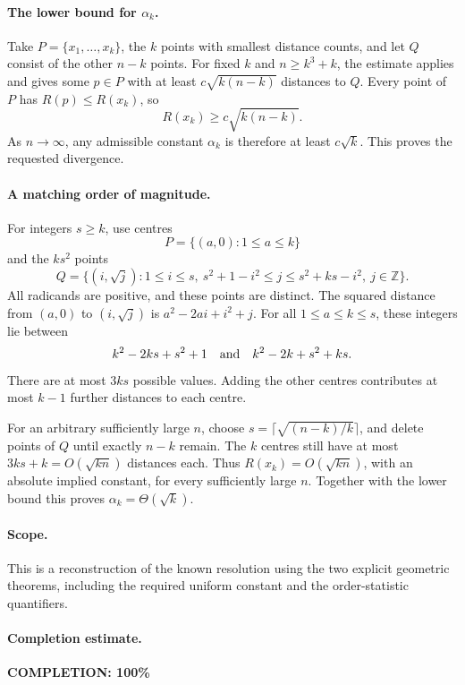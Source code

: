 \paragraph{The lower bound for \(\alpha_k\).}
Take \(P=\{x_1,\ldots,x_k\}\), the \(k\) points with smallest
distance counts, and let \(Q\) consist of the other \(n-k\) points.
For fixed \(k\) and \(n\geq k^3+k\), the estimate applies and gives
some \(p\in P\) with at least \(c\sqrt{k(n-k)}\) distances to \(Q\).
Every point of \(P\) has \(R(p)\leq R(x_k)\), so
\[
 R(x_k)\geq c\sqrt{k(n-k)}.
\]
As \(n\to\infty\), any admissible constant \(\alpha_k\) is therefore
at least \(c\sqrt k\). This proves the requested divergence.

\paragraph{A matching order of magnitude.}
For integers \(s\geq k\), use centres
\[
 P=\{(a,0):1\leq a\leq k\}
\]
and the \(ks^2\) points
\[
 Q=\{(i,\sqrt j):1\leq i\leq s,\
          s^2+1-i^2\leq j\leq s^2+ks-i^2,\ j\in\mathbb Z\}.
\]
All radicands are positive, and these points are distinct.
The squared distance from \((a,0)\) to \((i,\sqrt j)\) is
\(a^2-2ai+i^2+j\).
For all \(1\leq a\leq k\leq s\), these integers lie between
\[
 k^2-2ks+s^2+1
 \quad\hbox{and}\quad
 k^2-2k+s^2+ks.
\]
There are at most \(3ks\) possible values. Adding the other centres
contributes at most \(k-1\) further distances to each centre.

For an arbitrary sufficiently large \(n\), choose
\(s=\lceil\sqrt{(n-k)/k}\rceil\), and delete points of \(Q\)
until exactly \(n-k\) remain. The \(k\) centres still have
at most \(3ks+k=O(\sqrt{kn})\) distances each.
Thus \(R(x_k)=O(\sqrt{kn})\), with an absolute implied constant,
for every sufficiently large \(n\).
Together with the lower bound this proves
\(\alpha_k=\Theta(\sqrt k)\).

\paragraph{Scope.}
This is a reconstruction of the known resolution using the two
explicit geometric theorems, including the required uniform
constant and the order-statistic quantifiers.

\paragraph{Completion estimate.}
\textbf{COMPLETION: 100\%}
